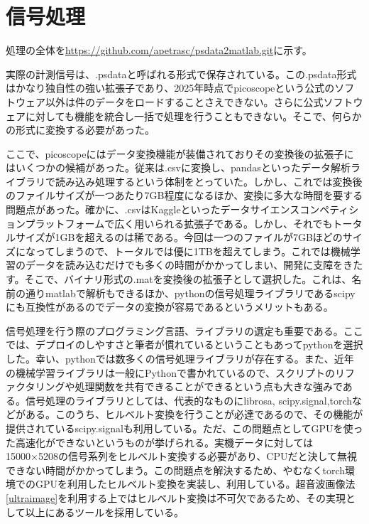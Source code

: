 \documentclass[uplatex]{suribt}
\begin{document}
\section{信号処理}
処理の全体を\url{https://github.com/apetrasc/psdata2matlab.git}に示す。\par
実際の計測信号は、.psdataと呼ばれる形式で保存されている。この.psdata形式はかなり独自性の強い拡張子であり、2025年時点でpicoscopeという公式のソフトウェア以外は件のデータをロードすることさえできない。さらに公式ソフトウェアに対しても機能を統合し一括で処理を行うこともできない。そこで、何らかの形式に変換する必要があった。\par
ここで、picoscopeにはデータ変換機能が装備されておりその変換後の拡張子にはいくつかの候補があった。従来は.csvに変換し、pandasといったデータ解析ライブラリで読み込み処理するという体制をとっていた。しかし、これでは変換後のファイルサイズが一つあたり7GB程度になるほか、変換に多大な時間を要する問題点があった。確かに、.csvはKaggleといったデータサイエンスコンペティションプラットフォームで広く用いられる拡張子である。しかし、それでもトータルサイズが1GBを超えるのは稀である。今回は一つのファイルが7GBほどのサイズになってしまうので、トータルでは優に1TBを超えてしまう。これでは機械学習のデータを読み込むだけでも多くの時間がかかってしまい、開発に支障をきたす。そこで、バイナリ形式の.matを変換後の拡張子として選択した。これは、名前の通りmatlabで解析もできるほか、pythonの信号処理ライブラリであるscipyにも互換性があるのでデータの変換が容易であるというメリットもある。\par
信号処理を行う際のプログラミング言語、ライブラリの選定も重要である。ここでは、デプロイのしやすさと筆者が慣れているということもあってpythonを選択した。幸い、pythonでは数多くの信号処理ライブラリが存在する。また、近年の機械学習ライブラリは一般にPythonで書かれているので、スクリプトのリファクタリングや処理関数を共有できることができるという点も大きな強みである。信号処理のライブラリとしては、代表的なものにlibrosa, scipy.signal,torchなどがある。このうち、ヒルベルト変換を行うことが必達であるので、その機能が提供されているscipy.signalも利用している。ただ、この問題点としてGPUを使った高速化ができないというものが挙げられる。実機データに対しては15000×5208の信号系列をヒルベルト変換する必要があり、CPUだと決して無視できない時間がかかってしまう。この問題点を解決するため、やむなくtorch環境でのGPUを利用したヒルベルト変換を実装し、利用している。超音波画像法\ref{ultraimage}を利用する上ではヒルベルト変換は不可欠であるため、その実現として以上にあるツールを採用している。\par
\end{document}
